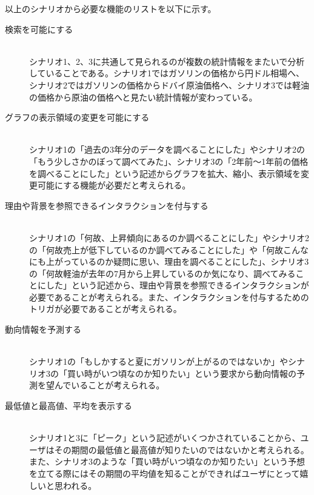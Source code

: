 \documentclass{matsushita-zemi}
\begin{document}
以上のシナリオから必要な機能のリストを以下に示す。
\begin{description}
 \item[検索を可能にする]\mbox{}\\ 
 シナリオ1、2、3に共通して見られるのが複数の統計情報をまたいで分析していることである。シナリオ1ではガソリンの価格から円ドル相場へ、シナリオ2ではガソリンの価格からドバイ原油価格へ、シナリオ3では軽油の価格から原油の価格へと見たい統計情報が変わっている。
 \item[グラフの表示領域の変更を可能にする]\mbox{}\\
 シナリオ1の「過去の3年分のデータを調べることにした」やシナリオ2の「もう少しさかのぼって調べてみた」、シナリオ3の「2年前〜1年前の価格を調べることにした」という記述からグラフを拡大、縮小、表示領域を変更可能にする機能が必要だと考えられる。
 \item[理由や背景を参照できるインタラクションを付与する]\mbox{}\\
 シナリオ1の「何故、上昇傾向にあるのか調べることにした」やシナリオ2の「何故売上が低下しているのか調べてみることにした」や「何故こんなにも上がっているのか疑問に思い、理由を調べることにした」、シナリオ3の「何故軽油が去年の7月から上昇しているのか気になり、調べてみることにした」という記述から、理由や背景を参照できるインタラクションが必要であることが考えられる。また、インタラクションを付与するためのトリガが必要であることが考えられる。
 \item[動向情報を予測する]\mbox{}\\
 シナリオ1の「もしかすると夏にガソリンが上がるのではないか」やシナリオ3の「買い時がいつ頃なのか知りたい」という要求から動向情報の予測を望んでいることが考えられる。
 \item[最低値と最高値、平均を表示する]\mbox{}\\
 シナリオ1と3に「ピーク」という記述がいくつかされていることから、ユーザはその期間の最低値と最高値が知りたいのではないかと考えられる。また、シナリオ3のような「買い時がいつ頃なのか知りたい」という予想を立てる際にはその期間の平均値を知ることができればユーザにとって嬉しいと思われる。
\end{description}

\end{document}

